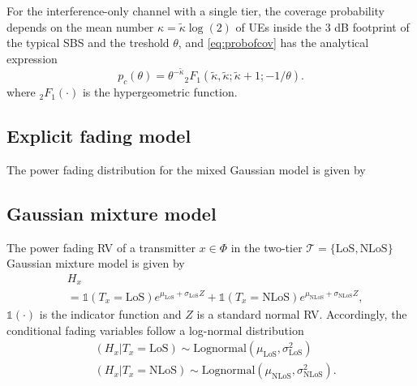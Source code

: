 \documentclass[conference]{IEEEtran}
\theoremstyle{definition}
\theoremstyle{plain}
\begin{document}
          For the interference-only channel with a single tier, the coverage probability depends on the mean number $\kappa = \tilde{\kappa} \log(2)$ of UEs inside the  $3$ dB footprint of the typical SBS and the treshold $\theta$, and \eqref{eq:probofcov} has the analytical expression
          \begin{equation}
p_c(\theta) =  \theta^{-\tilde{\kappa}} {_2F_1}\left(\tilde{\kappa}, \tilde{\kappa};\tilde{\kappa} + 1; -1/\theta \right).
          \end{equation}
          where $_2F_1(\cdot)$ is the hypergeometric function. 
          \subsection{Explicit fading model}
          The power fading distribution for the mixed Gaussian model is given by


          \subsection{Gaussian mixture model}
          The power fading RV of a transmitter $x \in \Phi$  in the two-tier $\mathcal{T} = \{\text{LoS},\text{NLoS}\}$ Gaussian mixture model is given by
            \begin{align}
              &H_x  \nonumber \\
              &=   \mathds{1}(T_x =\text{LoS})e^{\mu_{\text{LoS}}+\sigma_{\text{LoS}}Z} +\mathds{1}(T_x =\text{NLoS})e^{\mu_{\text{NLoS}}+\sigma_{\text{NLoS}}Z},
            \end{align}
            $\mathds{1}(\cdot)$ is the indicator function and $Z$ is a standard normal RV. Accordingly, the conditional fading variables follow a log-normal distribution
            \begin{align}
              &(H_x|T_x=\text{LoS}) \sim \text{Lognormal}(\mu_{\text{LoS}},\sigma_{\text{LoS}}^2) \\
              &(H_x|T_x=\text{NLoS}) \sim \text{Lognormal}(\mu_{\text{NLoS}},\sigma_{\text{NLoS}}^2).
            \end{align}
            
            

            


          
         


         
         
             
             
\end{document}
